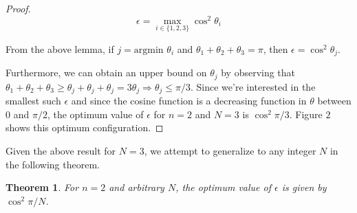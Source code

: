 \documentclass[11pt,letterpaper,twoside,english]{article}
\theoremstyle{theorem}
\newtheorem{theorem}{Theorem}[section]
\theoremstyle{remark}
\begin{document}
\begin{proof}
$$\epsilon = \max_{i \in \{1,2,3\}} \cos ^2 \theta_i$$

From the above lemma, if $j = \text{argmin } \theta_i$ and $\theta_1 + \theta_2 + \theta_3 = \pi$, then $\epsilon = \cos^2 \theta_j$.

Furthermore, we can obtain an upper bound on $\theta_j$ by observing that $\theta_ 1 + \theta_ 2 + \theta_3 \geq \theta_ j + \theta_j + \theta_j = 3 \theta_j \Rightarrow \theta_j \leq \pi/3$. Since we're interested in the smallest such $\epsilon$ and since the cosine function is a decreasing function in $\theta$ between $0$ and $\pi/2$, the optimum value of $\epsilon$ for $n=2$ and $N=3$ is $\cos^2 \pi / 3$. Figure $2$ shows this optimum configuration.

\end{proof}

Given the above result for $N=3$, we attempt to generalize to any integer $N$ in the following theorem.

\begin{theorem}
For $n=2$ and arbitrary $N$, the optimum value of $\epsilon$ is given by $\cos^2 \pi/N$.
\end{theorem}
\end{document}
